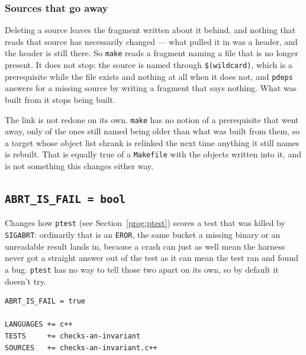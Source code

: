 \documentclass{article}
\begin{document}
\subsubsection{Sources that go away}

Deleting a source leaves the fragment written about it behind, and
nothing that reads that source has necessarily changed --- what pulled
it in was a header, and the header is still there.  So \texttt{make}
reads a fragment naming a file that is no longer present.  It does not
stop: the source is named through \texttt{\$(wildcard)}, which is a
prerequisite while the file exists and nothing at all when it does
not, and \texttt{pdeps} answers for a missing source by writing a
fragment that says nothing.  What was built from it stops being built.

The link is not redone on its own.  \texttt{make} has no notion of a
prerequisite that went away, only of the ones still named being older
than what was built from them, so a target whose object list shrank is
relinked the next time anything it still names is rebuilt.  That is
equally true of a \texttt{Makefile} with the objects written into it,
and is not something this changes either way.

\subsection{\texttt{ABRT\_IS\_FAIL = bool} \label{cmd:abrt_is_fail}}

Changes how \texttt{ptest} (see Section~\ref{prog:ptest}) scores a
test that was killed by \texttt{SIGABRT}: ordinarily that is an
\texttt{EROR}, the same bucket a missing binary or an unreadable
result lands in, because a crash can just as well mean the harness
never got a straight answer out of the test as it can mean the test
ran and found a bug.  \texttt{ptest} has no way to tell those two
apart on its own, so by default it doesn't try.

\begin{verbatim}
ABRT_IS_FAIL = true

LANGUAGES += c++
TESTS     += checks-an-invariant
SOURCES   += checks-an-invariant.c++
\end{verbatim}
\end{document}
